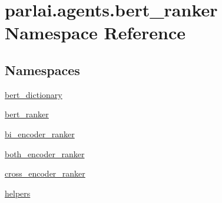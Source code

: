 \hypertarget{namespaceparlai_1_1agents_1_1bert__ranker}{}\section{parlai.\+agents.\+bert\+\_\+ranker Namespace Reference}
\label{namespaceparlai_1_1agents_1_1bert__ranker}
\subsection*{Namespaces}
\begin{DoxyCompactItemize}
\item 
 \hyperlink{namespaceparlai_1_1agents_1_1bert__ranker_1_1bert__dictionary}{bert\+\_\+dictionary}
\item 
 \hyperlink{namespaceparlai_1_1agents_1_1bert__ranker_1_1bert__ranker}{bert\+\_\+ranker}
\item 
 \hyperlink{namespaceparlai_1_1agents_1_1bert__ranker_1_1bi__encoder__ranker}{bi\+\_\+encoder\+\_\+ranker}
\item 
 \hyperlink{namespaceparlai_1_1agents_1_1bert__ranker_1_1both__encoder__ranker}{both\+\_\+encoder\+\_\+ranker}
\item 
 \hyperlink{namespaceparlai_1_1agents_1_1bert__ranker_1_1cross__encoder__ranker}{cross\+\_\+encoder\+\_\+ranker}
\item 
 \hyperlink{namespaceparlai_1_1agents_1_1bert__ranker_1_1helpers}{helpers}
\end{DoxyCompactItemize}

